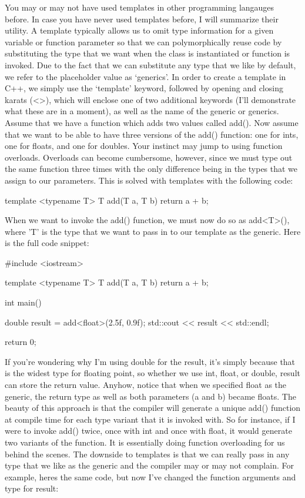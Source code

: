 \documentclass{article}
\begin{document}
You may or may not have used templates in other programming langauges before. In case you have never used
templates before, I will summarize their utility. A template typically allows us to omit type information for
a given variable or function parameter so that we can polymorphically reuse code by substituting the type that
we want when the class is instantiated or function is invoked. Due to the fact that we can substitute any
type that we like by default, we refer to the placeholder value as ‘generics’. In order to create a template
in C++, we simply use the ‘template’ keyword, followed by opening and closing karats (<>), which will enclose
one of two additional keywords (I’ll demonstrate what these are in a moment), as well as the name of the
generic or generics. Assume that we have a function which adds two values called add(). Now assume that we
want to be able to have three versions of the add() function: one for ints, one for floats, and one for
doubles. Your instinct may jump to using function overloads. Overloads can become cumbersome, however, since
we must type out the same function three times with the only difference being in the types that we assign to
our parameters. This is solved with templates with the following code:

\begin{cpplst}

template <typename T>
T add(T a, T b)
{
    return a + b;
}

\end{cpplst}

When we want to invoke the add() function, we must now do so as add<T>(), where 'T' is the type that we want
to pass in to our template as the generic. Here is the full code snippet:

\begin{cpplst}

#include <iostream>

template <typename T>
T add(T a, T b)
{
    return a + b;
}

int main()
{
    double result = add<float>(2.5f, 0.9f);
    std::cout << result << std::endl;

    return 0;
}

\end{cpplst}

If you’re wondering why I’m using double for the result, it’s simply because that is the widest type for
floating point, so whether we use int, float, or double, result can store the return value. Anyhow, notice
that when we specified float as the generic, the return type as well as both parameters (a and b) became
floats. The beauty of this approach is that the compiler will generate a unique add() function at compile
time for each type variant that it is invoked with. So for instance, if I were to invoke add() twice, once
with int and once with float, it would generate two variants of the function. It is essentially doing
function overloading for us behind the scenes. The downside to templates is that we can really pass in any
type that we like as the generic and the compiler may or may not complain. For example, heres the same code,
but now I’ve changed the function arguments and type for result:
\end{document}
